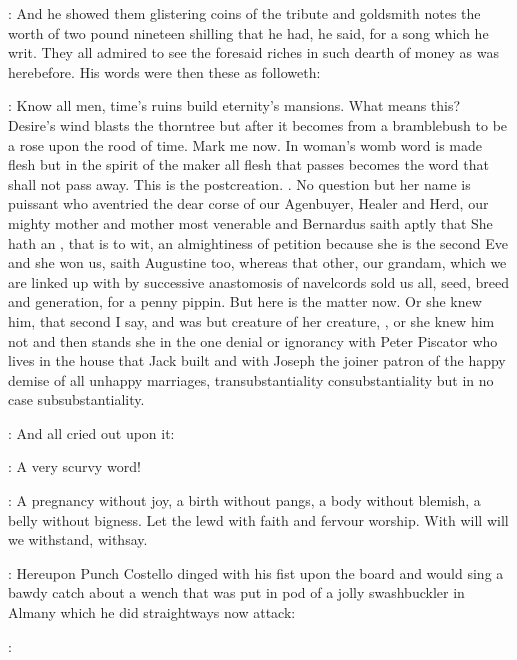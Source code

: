 : And he showed them glistering coins of the tribute and goldsmith
notes the worth of two pound nineteen shilling that he had, he said, for a
song which he writ. They all admired to see the foresaid riches in such
dearth of money as was herebefore. His words were then these as followeth:

\stephen: Know all men, time's ruins build eternity's mansions.
What means this? Desire's wind blasts the thorntree
but after it becomes from a bramblebush to be a
rose upon the rood of time. Mark me now. In woman's womb word is made
flesh but in the spirit of the maker all flesh that passes becomes the
word that shall not pass away. This is the postcreation.
.
No question but her name is puissant who aventried the dear corse
of our Agenbuyer, Healer and Herd, our mighty mother and mother most
venerable and Bernardus saith aptly that She hath an , that is to wit, an almightiness of petition because
she is the second Eve and she won us, saith Augustine too, whereas that
other, our grandam, which we are linked up with by successive anastomosis
of navelcords sold us all, seed, breed and generation, for a penny
pippin. But here is the matter now. Or she knew him, that second I say,
and was but creature of her creature, , or she knew him not and then stands she in the one denial or
ignorancy with Peter Piscator who lives in the house that Jack built and
with Joseph the joiner patron of the happy demise of all unhappy
marriages, 
 transubstantiality  consubstantiality
but in no case subsubstantiality.

: And all cried out upon it:

\All: A very scurvy word!

\stephen: A pregnancy without joy, a birth without pangs, a body without
blemish, a belly without bigness. Let the lewd with faith and fervour
worship. With will will we withstand, withsay.


: Hereupon Punch Costello dinged with his fist upon the board and would
sing a bawdy catch  about a wench that was
put in pod of a jolly swashbuckler in Almany which he did straightways
now attack:

\punch: 

